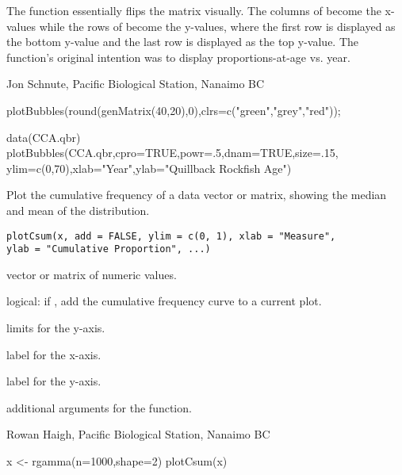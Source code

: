 \documentclass[letterpaper]{book}
\begin{document}
\begin{Details}\relax
The function  essentially flips the  matrix 
visually. The columns of  become the x-values while the rows of
 become the y-values, where the first row is displayed as the
bottom y-value and the last row is displayed as the top y-value. The 
function's original intention was to display proportions-at-age vs. year.
\end{Details}
\begin{Author}\relax
Jon Schnute, Pacific Biological Station, Nanaimo BC
\end{Author}
\begin{SeeAlso}\relax
{}
\end{SeeAlso}
\begin{Examples}
\begin{ExampleCode}
plotBubbles(round(genMatrix(40,20),0),clrs=c("green","grey","red"));

data(CCA.qbr)
plotBubbles(CCA.qbr,cpro=TRUE,powr=.5,dnam=TRUE,size=.15,
   ylim=c(0,70),xlab="Year",ylab="Quillback Rockfish Age")
\end{ExampleCode}
\end{Examples}

\begin{Description}\relax
Plot the cumulative frequency of a data vector or matrix, 
showing the median and mean of the distribution.
\end{Description}
\begin{Usage}
\begin{verbatim}
plotCsum(x, add = FALSE, ylim = c(0, 1), xlab = "Measure", 
ylab = "Cumulative Proportion", ...)  
\end{verbatim}
\end{Usage}
\begin{Arguments}
\begin{ldescription}
\item[\code{x}] vector or matrix of numeric values.
\item[\code{add}] logical: if , add the cumulative frequency curve to a current plot.
\item[\code{ylim}] limits for the y-axis.
\item[\code{xlab}] label for the x-axis.
\item[\code{ylab}] label for the y-axis.
\item[\code{...}] additional arguments for the  function.
\end{ldescription}
\end{Arguments}
\begin{Author}\relax
Rowan Haigh, Pacific Biological Station, Nanaimo BC
\end{Author}
\begin{Examples}
\begin{ExampleCode}
x <- rgamma(n=1000,shape=2)
plotCsum(x)
\end{ExampleCode}
\end{Examples}
\end{document}
